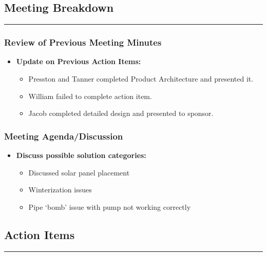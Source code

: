 \documentclass[12pt]{article}
\begin{document}
\subsection*{Meeting Breakdown}
\vspace{-1.3em}
\rule{\textwidth}{1pt}
\vspace{-2.3em}
\subsubsection*{Review of Previous Meeting Minutes}
\begin{itemize}[noitemsep, topsep=0pt]
    \item \textbf{Update on Previous Action Items:}
    \begin{itemize}[noitemsep, topsep=0pt]
        \item Presston and Tanner completed Product Architecture and presented it.
        \item William failed to complete action item. 
        \item Jacob completed detailed design and presented to sponsor.
    \end{itemize}
\end{itemize}

\subsubsection*{Meeting Agenda/Discussion}
\begin{itemize}[noitemsep, topsep=0pt]
    \item \textbf{Discuss possible solution categories:}
    \begin{itemize}[noitemsep, topsep=0pt]
        \item Discussed solar panel placement
        \item Winterization issues
        \item Pipe `bomb' issue with pump not working correctly 
        
    \end{itemize}
\end{itemize}


\subsection*{Action Items}
\vspace{-1.3em}
\rule{\textwidth}{1pt}
\vspace{-1em}
\end{document}
